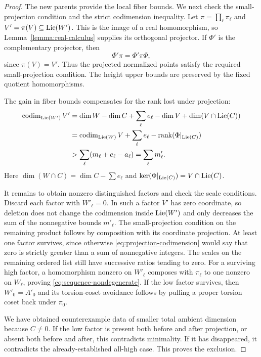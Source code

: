 \begin{proof}
The new parents provide the local fiber bounds. We next check the
small-projection condition and the strict codimension inequality.
Let $\pi=\prod_\ell\pi_\ell$ and
$V'=\pi(V)\subseteq\operatorname{Lie}(W')$. This is the image of a real
homomorphism, so Lemma~\ref{lemma:real-calculus} supplies its
orthogonal projector. If $\Phi'$ is the complementary projector,
then
\[
 \Phi'\pi=\Phi'\pi\Phi,
\]
since $\pi(V)=V'$. Thus the projected normalized points satisfy
the required small-projection condition. The height upper bounds
are preserved by the fixed quotient homomorphisms.

The gain in fiber bounds compensates for the rank lost under projection:
\begin{align}
 \operatorname{codim}_{\operatorname{Lie}(W')}V'
 &=\dim W-\dim C+\sum_\ell e_\ell
      -\dim V+\dim(V\cap\operatorname{Lie}(C))\notag\\
 &=\operatorname{codim}_{\operatorname{Lie}(W)}V+\sum_\ell e_\ell
      -\operatorname{rank}(\Phi|_{\operatorname{Lie}(C)})\notag\\
 &>\sum_\ell(m_\ell+e_\ell-a_\ell)
   =\sum_\ell m'_\ell.
 \label{eq:projection-codimension}
\end{align}
Here $\dim(W\cap C)=\dim C-\sum e_\ell$ and
$\ker(\Phi|_{\operatorname{Lie}(C)})=V\cap\operatorname{Lie}(C)$.

It remains to obtain nonzero distinguished factors and check the
scale conditions. Discard each factor with $W'_\ell=0$. In such a
factor $V'$ has zero coordinate, so deletion does not change the codimension inside
$\operatorname{Lie}(W')$ and only decreases the sum of the nonnegative bounds
$m'_\ell$. The small-projection condition on the remaining product
follows by composition with its coordinate projection. At least one
factor survives, since otherwise
\eqref{eq:projection-codimension} would say that zero is strictly
greater than a sum of nonnegative integers. The scales on the
remaining ordered list still have successive ratios tending to zero.
For a surviving high factor, a homomorphism nonzero on $W'_\ell$
composes with $\pi_\ell$ to one nonzero on $W_\ell$, proving
\eqref{eq:sequence-nondegenerate}. If the low factor survives, then
$W'_0=A'_0$ and its torsion-coset avoidance follows by pulling a
proper torsion coset back under $\pi_0$.

We have obtained counterexample data of smaller total ambient
dimension because $C\ne0$. If the low factor is present both before
and after projection, or absent both before and after, this
contradicts minimality. If it has disappeared, it contradicts the
already-established all-high case. This proves the exclusion.
\end{proof}


